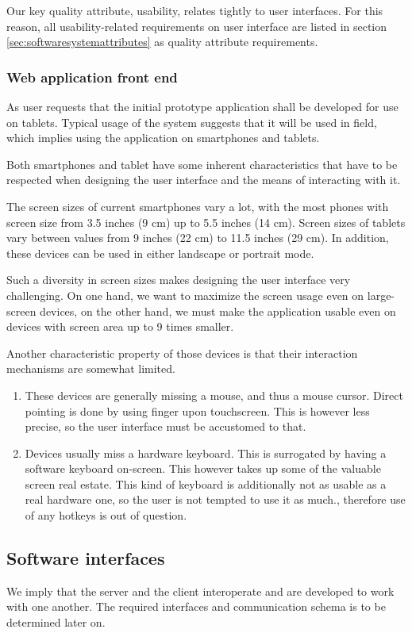 \documentclass[11pt]{book}
\begin{document}
Our key quality attribute, usability, relates tightly to user interfaces. For this reason, all usability-related requirements on user interface are listed in section \ref{sec:softwaresystemattributes} as quality attribute requirements.

\subsubsection{Web application front end}\label{sec:srs-webapplicationfrontend}
As user requests that the initial prototype application shall be developed for use on tablets. Typical usage of the system suggests that it will be used in field, which implies using the application on smartphones and tablets.

Both smartphones and tablet have some inherent characteristics that have to be respected when designing the user interface and the means of interacting with it.

The screen sizes of current smartphones vary a lot, with the most phones with screen size from 3.5 inches (9 cm) up to 5.5 inches (14 cm). Screen sizes of tablets vary between values from 9 inches (22 cm) to 11.5 inches (29 cm). In addition, these devices can be used in either landscape or portrait mode.

Such a diversity in screen sizes makes designing the user interface very challenging. On one hand, we want to maximize the screen usage even on large-screen devices, on the other hand, we must make the application usable even on devices with screen area up to 9 times smaller.

Another characteristic property of those devices is that their interaction mechanisms are somewhat limited.

\begin{enumerate}
  \item These devices are generally missing a mouse, and thus a mouse cursor. Direct pointing is done by using finger upon touchscreen. This is however less precise, so the user interface must be accustomed to that.
  \item Devices usually miss a hardware keyboard. This is surrogated by having a software keyboard on-screen. This however takes up some of the valuable screen real estate. This kind of keyboard is additionally not as usable as a real hardware one, so the user is not tempted to use it as much., therefore use of any hotkeys is out of question.
\end{enumerate}

\subsection{Software interfaces}
We imply that the server and the client interoperate and are developed to work with one another. The required interfaces and communication schema is to be determined later on.
\end{document}
